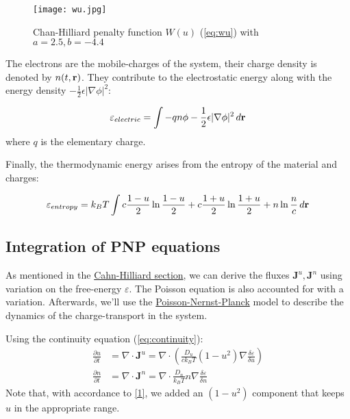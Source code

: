 \documentclass[12pt]{article}
\begin{document}
\begin{figure}[h!] 
	\centering 
	\texttt{[image: wu.jpg]}
	\caption{Chan-Hilliard penalty function $W(u)$ (\ref{eq:wu}) with $a=2.5, b=-4.4$} \label{fig:wu}
\end{figure}

The electrons are the mobile-charges of the system, their charge density is denoted by $n(t, {\bf r})$. They contribute to the electrostatic energy along with the energy density $- \frac{1}{2}\epsilon|\nabla \phi|^2$:

\begin{equation}
    \varepsilon_{electric} = \int -qn\phi - \frac{1}{2}\epsilon|\nabla \phi|^2 \, d{\bf r}
\end{equation}
where $q$ is the elementary charge. 


Finally, the thermodynamic energy arises from the entropy of the material and charges:

\begin{equation}
    \varepsilon_{entropy} = k_BT \int c\frac{1-u}{2}\ln{\frac{1-u}{2}} + c\frac{1+u}{2}\ln{\frac{1+u}{2}} + n\ln{\frac{n}{c}} \, d{\bf r}
\end{equation}

\subsection{Integration of PNP equations}
As mentioned in the \hyperref[sec:Cahn-Hilliard] {Cahn-Hilliard section}, we can derive the fluxes $\mathbf{J}^u, \mathbf{J}^n$ using variation on the free-energy $\varepsilon$. The Poisson equation is also accounted for with a variation. Afterwards, we'll use the \hyperref[sec:pnp]{Poisson-Nernst-Planck} model to describe the dynamics of the charge-transport in the system. 

Using the continuity equation (\ref{eq:continuity}):
\begin{equation}
    \begin{aligned}
        \frac{\partial u}{\partial t} &= \nabla \cdot \mathbf{J}^u = \nabla \cdot \left( \frac{D_u}{ck_BT}(1-u^2)\nabla \frac{\delta \varepsilon}{\delta u} \right)\\
        \frac{\partial n}{\partial t} &= \nabla \cdot \mathbf{J}^n = \nabla \cdot \frac{D_n}{k_BT}n \nabla \frac{\delta \varepsilon}{\delta n}
    \end{aligned}
\end{equation}
Note that, with accordance to \hyperref[c:1]{[1]}, we added an $(1-u^2)$ component that keeps $u$ in the appropriate range.
\end{document}
